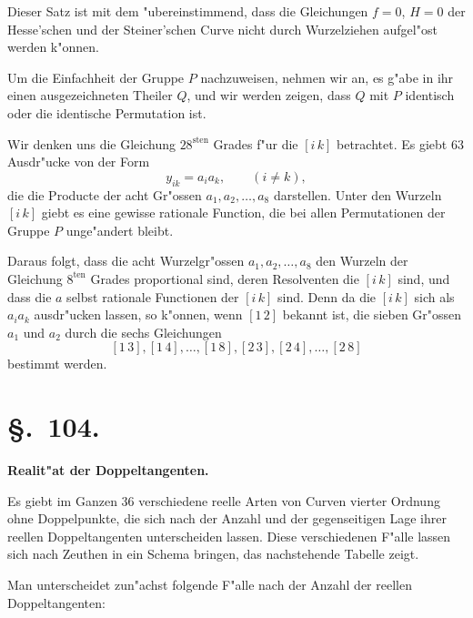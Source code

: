 \documentclass[12pt,a4paper]{article}
\theoremstyle{plain}
\begin{document}
Dieser Satz ist mit dem "ubereinstimmend, dass die Gleichungen $f=0$, $H=0$ der Hesse'schen und der Steiner'schen Curve nicht durch Wurzelziehen aufgel"ost werden k"onnen.

Um die Einfachheit der Gruppe $P$ nachzuweisen, nehmen wir an, es g"abe in ihr einen ausgezeichneten Theiler $Q$, und wir werden zeigen, dass $Q$ mit $P$ identisch oder die identische Permutation ist.

Wir denken uns die Gleichung $28^{\text{sten}}$ Grades f"ur die $[i\,k]$ betrachtet. Es giebt $63$ Ausdr"ucke von der Form
\[y_{ik} = a_i a_k, \qquad (i\neq k),\]
die die Producte der acht Gr"ossen $a_1, a_2, \ldots, a_8$ darstellen. Unter den Wurzeln $[i\,k]$ giebt es eine gewisse rationale Function, die bei allen Permutationen der Gruppe $P$ unge"andert bleibt.

Daraus folgt, dass die acht Wurzelgr"ossen $a_1, a_2, \ldots, a_8$ den Wurzeln der Gleichung $8^{\text{ten}}$ Grades proportional sind, deren Resolventen die $[i\,k]$ sind, und dass die $a$ selbst rationale Functionen der $[i\,k]$ sind. Denn da die $[i\,k]$ sich als $a_i a_k$ ausdr"ucken lassen, so k"onnen, wenn $[1\,2]$ bekannt ist, die sieben Gr"ossen $a_1$ und $a_2$ durch die sechs Gleichungen
\[[1\,3],[1\,4],\ldots,[1\,8],[2\,3],[2\,4],\ldots,[2\,8]\]
bestimmt werden.

\section*{\S.~104.}
\begin{center}
\large\bfseries Realit"at der Doppeltangenten.
\end{center}
\vspace{0.5em}

Es giebt im Ganzen 36 verschiedene reelle Arten von Curven vierter Ordnung ohne Doppelpunkte, die sich nach der Anzahl und der gegenseitigen Lage ihrer reellen Doppeltangenten unterscheiden lassen. Diese verschiedenen F"alle lassen sich nach Zeuthen in ein Schema bringen, das nachstehende Tabelle zeigt.

Man unterscheidet zun"achst folgende F"alle nach der Anzahl der reellen Doppeltangenten:
\end{document}
